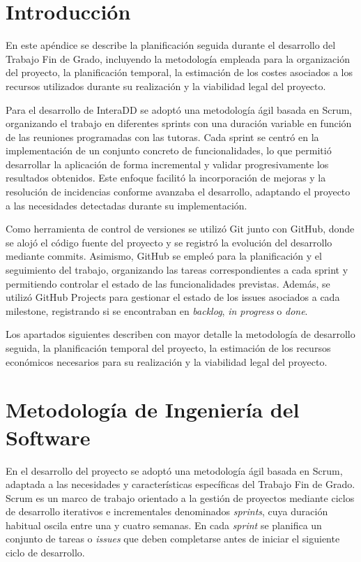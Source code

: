 
\section{Introducción}

En este apéndice se describe la planificación seguida durante el desarrollo del Trabajo Fin de Grado, incluyendo la metodología 
empleada para la organización del proyecto, la planificación temporal, la estimación de los costes asociados a los recursos 
utilizados durante su realización y la viabilidad legal del proyecto.

Para el desarrollo de InteraDD se adoptó una metodología ágil basada en Scrum, organizando el trabajo en diferentes sprints 
con una duración variable en función de las reuniones programadas con las tutoras. Cada sprint se centró en la implementación 
de un conjunto concreto de funcionalidades, lo que permitió desarrollar la aplicación de forma incremental y validar progresivamente 
los resultados obtenidos. Este enfoque facilitó la incorporación de mejoras y la resolución de incidencias conforme avanzaba el 
desarrollo, adaptando el proyecto a las necesidades detectadas durante su implementación.

Como herramienta de control de versiones se utilizó Git junto con GitHub, donde se alojó el código fuente del proyecto y se registró 
la evolución del desarrollo mediante commits. Asimismo, GitHub se empleó para la planificación y el seguimiento del trabajo, 
organizando las tareas correspondientes a cada sprint y permitiendo controlar el estado de las funcionalidades previstas. 
Además, se utilizó GitHub Projects para gestionar el estado de los issues asociados a cada milestone, registrando si se encontraban 
en \textit{backlog}, \textit{in progress} o \textit{done}.

Los apartados siguientes describen con mayor detalle la metodología de desarrollo seguida, la planificación temporal del proyecto, 
la estimación de los recursos económicos necesarios para su realización y la viabilidad legal del proyecto.

\section{Metodología de Ingeniería del Software}
En el desarrollo del proyecto se adoptó una metodología ágil basada en Scrum, adaptada a las necesidades y características específicas del Trabajo Fin de Grado. Scrum es un marco de trabajo orientado a la gestión de proyectos mediante ciclos de desarrollo iterativos e incrementales denominados \textit{sprints}, cuya duración habitual oscila entre una y cuatro semanas. En cada \textit{sprint} se planifica un conjunto de tareas o \textit{issues} que deben completarse antes de iniciar el siguiente ciclo de desarrollo.

